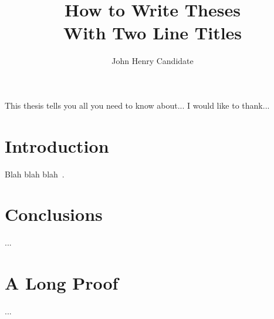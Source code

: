 \documentclass{report}
\begin{document}
\title{How to Write Theses\\
            With Two Line Titles}
\author{John Henry Candidate}
 
\beforepreface
{}
This thesis tells you all you need to know about...
I would like to thank...
\afterpreface

\chapter{Introduction}

Blah blah blah~\cite{ceres-solver}.

\chapter{Conclusions}
...
\appendix
\chapter{A Long Proof}
...


\end{document}

